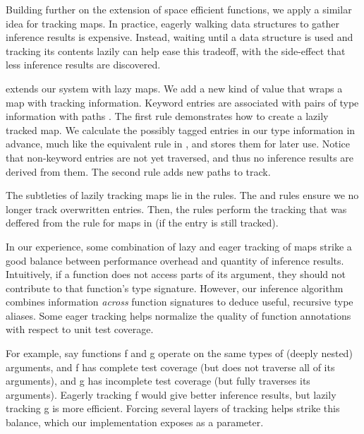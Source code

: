 
Building further on the extension of space efficient functions,
we apply a similar idea for tracking maps.
In practice, eagerly walking data structures to gather inference
results is expensive.
Instead,
waiting until a data structure is used and tracking its contents
lazily can help ease this tradeoff, with the side-effect that
less inference results are discovered.

 extends our system with lazy maps.
We add a new kind of value 
\MProxyV{\curlymap{\ova{\kw{}\ \v{}}}}{\curlymap{\ova{\kwp{}\ \curlymap{\ova{\HMapreq{}\ \ova{\inferpath{}}}}}}}
that wraps a map \curlymap{\ova{\kw{}\ \v{}}} with tracking information.
Keyword entries \kwp{} are associated with pairs of type information \HMapreq{}
with paths \ova{\inferpath{}}.
The first \trackEOp{} rule demonstrates how to create
a lazily tracked map.
We calculate the possibly tagged entries in our type information in advance,
much like the equivalent rule in , and stores
them for later use. Notice that non-keyword entries are not yet traversed,
and thus no inference results are derived from them.
The second \trackEOp{} rule adds new paths to track.

The subtleties of lazily tracking maps lie in the \constantopsemliteral{}
rules.
The \assocliteral{} and \dissocliteral{} rules ensure we no longer track overwritten entries.
Then, the \getliteral{} rules perform the tracking that was deffered
from the \trackEOp{} rule for maps in 
(if the entry is still tracked).

In our experience, some combination of lazy and eager tracking of
maps strike a good balance between performance overhead and
quantity of inference results.
Intuitively, if a function does not access parts of its argument,
they should not contribute to that function's type signature.
However, our inference algorithm combines information 
\emph{across} function signatures to deduce useful, recursive
type aliases.
Some eager tracking helps normalize the quality of function annotations
with respect to unit test coverage.

For example, say functions \textsf{f} and \textsf{g} operate on the same
types of (deeply nested) arguments, and \textsf{f} has complete test coverage (but does not
traverse all of its arguments), and \textsf{g} has incomplete test coverage
(but fully traverses its arguments).
Eagerly tracking \textsf{f} would give better inference results,
but lazily tracking \textsf{g} is more efficient.
Forcing several layers of tracking helps strike this balance, which
our implementation exposes as a parameter.

